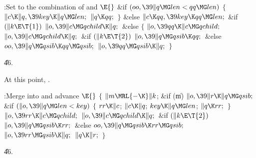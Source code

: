 \B{}:Set  to the combination of  and \X${}%
\E{}$\6
\&{if} ${}(\\{oo},\39\|q\MG\\{len}<\\{qq}\MG\\{len}){}$\5
${}\{{}$\1\6
${}\|c\K\|q,\39\\{key}\K\|q\MG\\{len};{}$\6
${}\|q\K\\{qq};{}$\6
\4${}\}{}$\5
\2\&{else}\1\5
${}\|c\K\\{qq},\39\\{key}\K\\{qq}\MG\\{len};{}$\2\6
\&{if} ${}(\|k\E\T{1}){}$\1\5
${}\|o,\39\|c\MG\\{qchild}\K\|q;{}$\2\6
\&{else}\5
${}\{{}$\1\6
${}\|o,\39\\{qq}\K\|c\MG\\{qchild};{}$\6
${}\|o,\39\|c\MG\\{qchild}\K\|q;{}$\6
\&{if} ${}(\|k\E\T{2}){}$\1\5
${}\|o,\39\|q\MG\\{qsib}\K\\{qq};{}$\2\6
\&{else}\1\5
${}\\{oo},\39\|q\MG\\{qsib}\K\\{qq}\MG\\{qsib};{}$\2\6
${}\|o,\39\\{qq}\MG\\{qsib}\K\|q;{}$\6
\4${}\}{}$\2\par
\U46.\fi

At this point, .

\Y\B\4:Merge  into  and advance \X${}\E{}$\6
${}\{{}$\1\6
${}\|m\MRL{-{\K}}\|k{}$;\5
\&{if} (\|m)\1\5
${}\|o,\39\|r\K\|q\MG\\{qsib};{}$\2\6
\&{if} ${}(\|o,\39\|q\MG\\{len}<\\{key}){}$\5
${}\{{}$\1\6
${}\\{rr}\K\|c{}$;\5
${}\|c\K\|q{}$;\5
${}\\{key}\K\|q\MG\\{len}{}$;\5
${}\|q\K\\{rr};{}$\6
\4${}\}{}$\2\6
${}\|o,\39\\{rr}\K\|c\MG\\{qchild};{}$\6
${}\|o,\39\|c\MG\\{qchild}\K\|q;{}$\6
\&{if} ${}(\|k\E\T{2}){}$\1\5
${}\|o,\39\|q\MG\\{qsib}\K\\{rr};{}$\2\6
\&{else}\1\5
${}\\{oo},\39\|q\MG\\{qsib}\K\\{rr}\MG\\{qsib};{}$\2\6
${}\|o,\39\\{rr}\MG\\{qsib}\K\|q;{}$\6
${}\|q\K\|r;{}$\6
\4${}\}{}$\2\par
\U46.\fi

